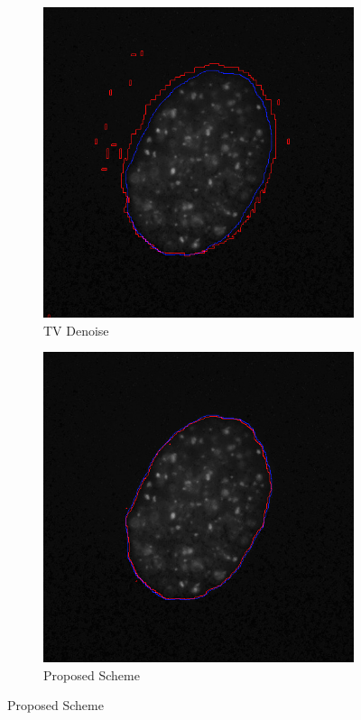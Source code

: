 \documentclass[a4paper,11pt]{ijamas}
\begin{document}
{\begin{figure}
\begin{subfigure}{.25\textwidth}
  \includegraphics[width=0.80\columnwidth]{./figs/results/4tv.jpg}
 \caption{TV Denoise}
  \label{fig:tvseg_4}
\end{subfigure}%
\begin{subfigure}{.25\textwidth}
  \centering
  \includegraphics[width=0.80\columnwidth]{./figs/results/4scheme.jpg}
 \caption{Proposed Scheme}
  \label{fig:schemeseg_4}
\end{subfigure}%



\end{figure}}
\end{document}
